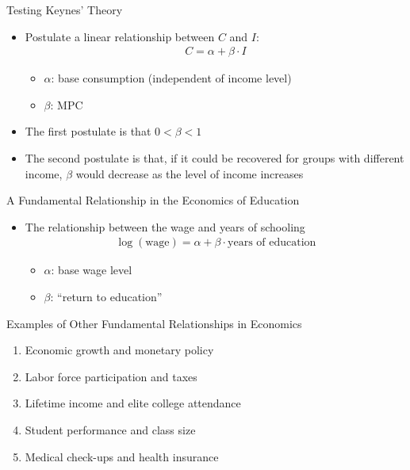 \documentclass[static]{JJH-Beamer}
\begin{document}
\begin{frame}{Testing Keynes' Theory}
	\begin{itemize}
	\item Postulate a linear relationship between $C$ and $I$: 
	\begin{align} 
	C = \alpha + \beta \cdot I \nonumber
	\end{align}
		\begin{itemize}
			\item $\alpha$: base consumption (independent of income level)
			\item $\beta$: MPC
		\end{itemize}
	\bigskip
	\item The first postulate is that $0 < \beta < 1$
	\bigskip
	\item The second postulate is that, if it could be recovered for groups with different income, $\beta$ would decrease as the level of income increases
	\end{itemize}
\end{frame}

\begin{frame}{A Fundamental Relationship in the Economics of Education}
\begin{itemize}
\item The relationship between the wage and years of schooling
\begin{align}
\log (\text{wage}) = \alpha + \beta \cdot \text{years of education} \nonumber
\end{align}
		\begin{itemize}
			\item $\alpha$: base wage level
			\item $\beta$: ``return to education'' 
		\end{itemize}
\end{itemize}
\end{frame} 

\begin{frame}{Examples of Other Fundamental Relationships in Economics}
	\begin{enumerate}
		\item Economic growth and monetary policy
		\bigskip
		\item Labor force participation and taxes
		\bigskip
		\item Lifetime income and elite college attendance 
		\bigskip
		\item Student performance and class size
		\bigskip
		\item Medical check-ups and health insurance
	\end{enumerate}
\end{frame}
\end{document}
